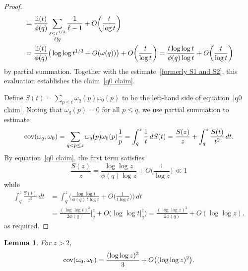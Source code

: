 \documentclass[12pt,reqno]{amsart}
\newtheorem{lemma}[theorem]{Lemma}
\theoremstyle{definition}
\newcommand{\cov}{\mathop{\rm cov}\nolimits}
\newcommand{\li}{\mathop{\rm li}\nolimits}
\begin{document}
\begin{proof}
\begin{align}
&= \frac{\li(t)}{\phi(q)} \sum_{\substack{\ell \leq t^{1/3} \\ \ell \nmid q}} \frac1{\ell-1} + O\bigg(\frac{t}{\log t}\bigg) \label{BV use to copy} \\
&= \frac{\li(t)}{\phi(q)} \big( \log\log t^{1/3} + O(\omega(q)) \big) + O\bigg(\frac{t}{\log t}\bigg) = \frac{t\log\log t}{\phi(q)\log t} + O\bigg(\frac{t}{\log t}\bigg) \notag
\end{align}
by partial summation. Together with the estimate~\eqref{formerly S1 and S2}, this evaluation establishes the claim~\eqref{q0 claim}.

Define $S(t) = \sum_{p \leq t} \omega_q(p) \omega_0(p)$ to be the left-hand side of equation~\eqref{q0 claim}. Noting that $\omega_q(p) = 0$ for all $p \leq q$, we use partial summation to estimate
\begin{align*}
\cov(\omega_q, \omega_{0}) = \sum_{q<p \leq z} \omega_q(p) \omega_0(p) \frac{1}{p} = \int_q^z \frac{1}{t} \, dS(t) = \frac{S(z)}{z} + \int_q^z \frac{S(t)}{t^2} \, dt.
\end{align*}
By equation~\eqref{q0 claim}, the first term satisfies
\[
\frac{S(z)}{z} = \frac{\log\log z}{\phi(q) \log z} + O\bigg(\frac{1}{\log z}\bigg) \ll 1
\]
while
\begin{align*}
\int_q^z \frac{S(t)}{t^2} \, dt &= \int_q^z \bigg( \frac{\log\log t}{\phi(q)\, t \log t} + O\bigg(\frac{1}{t \log t}\bigg) \bigg) \, dt \\
&= \frac{(\log\log t)^2}{2 \phi(q)} \bigg|_q^z + O\big(\log\log t \big|_q^z\big) = \frac{(\log\log z)^2}{2 \phi(q)} + O(\log\log z).
\end{align*}
as required.
\end{proof}

\begin{lemma}  \label{big cov lemma}
For $z>2$,
\[
\displaystyle \cov(\omega_{0}, \omega_{0}) = \frac{(\log\log z)^3}{3} + O\big( (\log\log z)^2 \big).
\]
\end{lemma}
\end{document}

